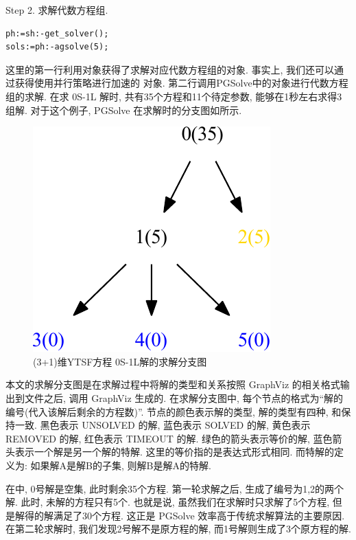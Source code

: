 Step 2. 求解代数方程组.
\begin{verbatim}
ph:=sh:-get_solver();
sols:=ph:-agsolve(5);
\end{verbatim}
这里的第一行利用对象获得了求解对应代数方程组的对象. 事实上, 我们还可以通过获得使用并行策略进行加速的 对象. 第二行调用PGSolve中的对象进行代数方程组的求解. 在求 0S-1L 解时, 共有35个方程和11个待定参数, 能够在1秒左右求得3组解. 对于这个例子, PGSolve 在求解时的分支图如所示. 

\begin{figure}[htbp]
\centering
\includegraphics[width=.35\textwidth]{fig/0S1L.pdf}
\caption{(3+1)维YTSF方程 0S-1L解的求解分支图}\label{sb0}
\end{figure}

本文的求解分支图是在求解过程中将解的类型和关系按照 GraphViz\cite{ellson2001graphviz} 的相关格式输出到文件之后, 调用 GraphViz 生成的. 在求解分支图中, 每个节点的格式为``解的编号(代入该解后剩余的方程数)''. 节点的颜色表示解的类型, 解的类型有四种, 和保持一致. 黑色表示 UNSOLVED 的解, 蓝色表示 SOLVED 的解, 黄色表示 REMOVED 的解, 红色表示 TIMEOUT 的解. 绿色的箭头表示等价的解, 蓝色箭头表示一个解是另一个解的特解. 这里的等价指的是表达式形式相同. 而特解的定义为: 如果解A是解B的子集, 则解B是解A的特解. 

在中, 0号解是空集, 此时剩余35个方程. 第一轮求解之后, 生成了编号为1,2的两个解. 此时, 未解的方程只有5个. 也就是说, 虽然我们在求解时只求解了5个方程, 但是解得的解满足了30个方程. 这正是 PGSolve 效率高于传统求解算法的主要原因. 在第二轮求解时, 我们发现2号解不是原方程的解, 而1号解则生成了3个原方程的解. 

